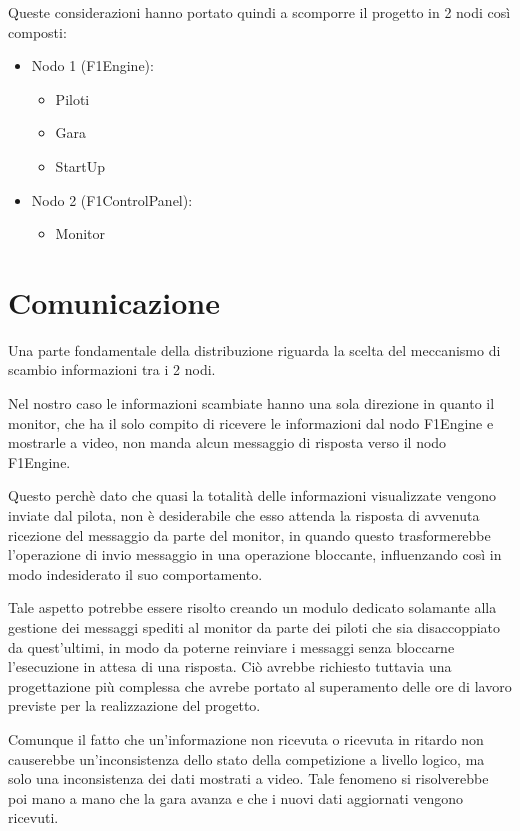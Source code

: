 \documentclass[a4paper,11pt, twoside]{book}
\begin{document}
      Queste considerazioni hanno portato quindi a scomporre il progetto in 2 nodi così composti:
      
      \begin{itemize}
	\item Nodo 1 (F1Engine):
	\begin{itemize}
	  \item Piloti
	  \item Gara
	  \item StartUp
	\end{itemize}
	\item Nodo 2 (F1ControlPanel):
	\begin{itemize}
	  \item Monitor
	\end{itemize}
      \end{itemize}
          
    \section{Comunicazione}
    \label{Comunicazione}
      Una parte fondamentale della distribuzione riguarda la scelta del meccanismo di scambio informazioni tra i 2 nodi.
      
      Nel nostro caso le informazioni scambiate hanno una sola direzione in quanto il monitor, che ha il solo compito di
      ricevere le informazioni dal nodo F1Engine e mostrarle a video, non manda alcun messaggio
      di risposta verso il nodo F1Engine.
      
      Questo perchè dato che quasi la totalità delle informazioni visualizzate
      vengono inviate dal pilota, non è desiderabile che esso
      attenda la risposta di avvenuta ricezione del messaggio da parte del monitor,
      in quando questo trasformerebbe l'operazione di invio messaggio in una operazione bloccante, influenzando così
      in modo indesiderato il suo comportamento.
      
      Tale aspetto potrebbe essere risolto creando un modulo dedicato solamante alla gestione dei messaggi spediti al monitor
      da parte dei piloti che sia disaccoppiato da quest'ultimi, in modo da poterne reinviare i messaggi senza 
      bloccarne l'esecuzione in attesa di una risposta.
      Ciò avrebbe richiesto tuttavia una progettazione più complessa che avrebe portato al superamento delle ore di lavoro
      previste per la realizzazione del progetto.
      
      Comunque il fatto che un'informazione non ricevuta o ricevuta in ritardo 
      non causerebbe un'inconsistenza dello stato della competizione a livello logico,
      ma solo una inconsistenza dei dati mostrati a video. Tale fenomeno si risolverebbe poi mano a mano che la gara avanza
      e che i nuovi dati aggiornati vengono ricevuti.
      
\end{document}

